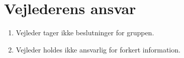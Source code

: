 \section{Vejlederens ansvar}
\begin{enumerate}
\item{Vejleder tager ikke beslutninger for gruppen.}
\item{Vejleder holdes ikke ansvarlig for forkert information.}
\end{enumerate}
